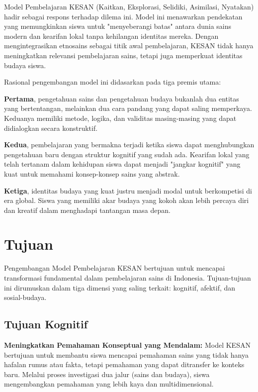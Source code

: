 \documentclass[12pt,a4paper,oneside]{book}
\begin{document}
Model Pembelajaran KESAN (Kaitkan, Eksplorasi, Selidiki, Asimilasi, Nyatakan) hadir sebagai respons terhadap dilema ini. Model ini menawarkan pendekatan yang memungkinkan siswa untuk "menyeberangi batas" antara dunia sains modern dan kearifan lokal tanpa kehilangan identitas mereka. Dengan mengintegrasikan etnosains sebagai titik awal pembelajaran, KESAN tidak hanya meningkatkan relevansi pembelajaran sains, tetapi juga memperkuat identitas budaya siswa.

Rasional pengembangan model ini didasarkan pada tiga premis utama:

\textbf{Pertama}, pengetahuan sains dan pengetahuan budaya bukanlah dua entitas yang bertentangan, melainkan dua cara pandang yang dapat saling memperkaya. Keduanya memiliki metode, logika, dan validitas masing-masing yang dapat didialogkan secara konstruktif.

\textbf{Kedua}, pembelajaran yang bermakna terjadi ketika siswa dapat menghubungkan pengetahuan baru dengan struktur kognitif yang sudah ada. Kearifan lokal yang telah tertanam dalam kehidupan siswa dapat menjadi "jangkar kognitif" yang kuat untuk memahami konsep-konsep sains yang abstrak.

\textbf{Ketiga}, identitas budaya yang kuat justru menjadi modal untuk berkompetisi di era global. Siswa yang memiliki akar budaya yang kokoh akan lebih percaya diri dan kreatif dalam menghadapi tantangan masa depan.

\section{Tujuan}

Pengembangan Model Pembelajaran KESAN bertujuan untuk mencapai transformasi fundamental dalam pembelajaran sains di Indonesia. Tujuan-tujuan ini dirumuskan dalam tiga dimensi yang saling terkait: kognitif, afektif, dan sosial-budaya.

\subsection{Tujuan Kognitif}

\textbf{Meningkatkan Pemahaman Konseptual yang Mendalam:} Model KESAN bertujuan untuk membantu siswa mencapai pemahaman sains yang tidak hanya hafalan rumus atau fakta, tetapi pemahaman yang dapat ditransfer ke konteks baru. Melalui proses investigasi dua jalur (sains dan budaya), siswa mengembangkan pemahaman yang lebih kaya dan multidimensional.
\end{document}
